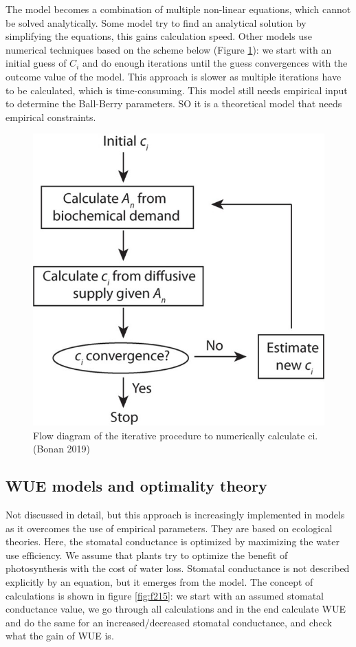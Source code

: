 \documentclass[
  12pt,
  oneside]{book}
\begin{document}
The model becomes a combination of multiple non-linear equations, which cannot be solved analytically. Some model try to find an analytical solution by simplifying the equations, this gains calculation speed. Other models use numerical techniques based on the scheme below (Figure \ref{fig:f214}): we start with an initial guess of \(C_i\) and do enough iterations until the guess convergences with the outcome value of the model. This approach is slower as multiple iterations have to be calculated, which is time-consuming.
This model still needs empirical input to determine the Ball-Berry parameters. SO it is a theoretical model that needs empirical constraints.

\begin{figure}

{\centering \includegraphics[width=0.8\linewidth]{figures/chap2/numerical_solution} 

}

\caption{Flow diagram of the iterative procedure to numerically calculate ci.(Bonan 2019)}\label{fig:f214}
\end{figure}

\hypertarget{wue-models-and-optimality-theory}{%
\subsection{WUE models and optimality theory}\label{wue-models-and-optimality-theory}}

Not discussed in detail, but this approach is increasingly implemented in models as it overcomes the use of empirical parameters. They are based on ecological theories. Here, the stomatal conductance is optimized by maximizing the water use efficiency. We assume that plants try to optimize the benefit of photosynthesis with the cost of water loss. Stomatal conductance is not described explicitly by an equation, but it emerges from the model.
The concept of calculations is shown in figure \ref{fig:f215}: we start with an assumed stomatal conductance value, we go through all calculations and in the end calculate WUE and do the same for an increased/decreased stomatal conductance, and check what the gain of WUE is.
\end{document}
